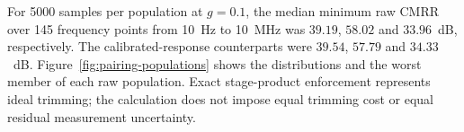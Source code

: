 For 5000 samples per population at $g=0.1$, the median minimum raw CMRR over 145 frequency points from 10~Hz to 10~MHz was $39.19$, $58.02$ and $33.96$~dB, respectively. The calibrated-response counterparts were $39.54$, $57.79$ and $34.33$~dB. Figure~\ref{fig:pairing-populations} shows the distributions and the worst member of each raw population. Exact stage-product enforcement represents ideal trimming; the calculation does not impose equal trimming cost or equal residual measurement uncertainty.




